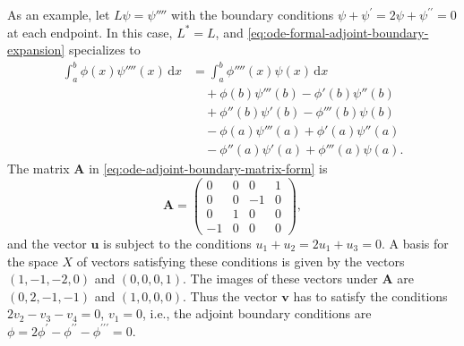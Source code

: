 As an example, let $L\psi=\psi''''$ with the boundary conditions $\psi+\psi^{\prime}=2\psi+\psi^{\prime\prime}=0$ at each endpoint. In this case, $L^*=L$, and \eqref{eq:ode-formal-adjoint-boundary-expansion} specializes to
\begin{equation}\label{eq:fourth-order-ode-green-identity}
\begin{aligned}
\int_a^b\phi(x)\psi''''(x)\,\mathrm{d}x
&=\int_a^b\phi''''(x)\psi(x)\,\mathrm{d}x\\
&\quad+\phi(b)\psi'''(b)-\phi'(b)\psi''(b)\\
&\quad+\phi''(b)\psi'(b)-\phi'''(b)\psi(b)\\
&\quad-\phi(a)\psi'''(a)+\phi'(a)\psi''(a)\\
&\quad-\phi''(a)\psi'(a)+\phi'''(a)\psi(a).
\end{aligned}
\end{equation}
The matrix $\bm{A}$ in \eqref{eq:ode-adjoint-boundary-matrix-form} is
\begin{equation}\label{eq:fourth-order-ode-boundary-matrix}
\bm{A}=\begin{pmatrix}0&0&0&1\\0&0&-1&0\\0&1&0&0\\-1&0&0&0\end{pmatrix},
\end{equation}
and the vector $\bm{u}$ is subject to the conditions $u_1+u_2=2u_1+u_3=0$. A basis for the space $X$ of vectors satisfying these conditions is given by the vectors $(1,-1,-2,0)$ and $(0,0,0,1)$. The images of these vectors under $\bm{A}$ are $(0,2,-1,-1)$ and $(1,0,0,0)$. Thus the vector $\bm{v}$ has to satisfy the conditions $2v_2-v_3-v_4=0$, $v_1=0$, i.e., the adjoint boundary conditions are $\phi=2\phi^{\prime}-\phi^{\prime\prime}-\phi^{\prime\prime\prime}=0$.
